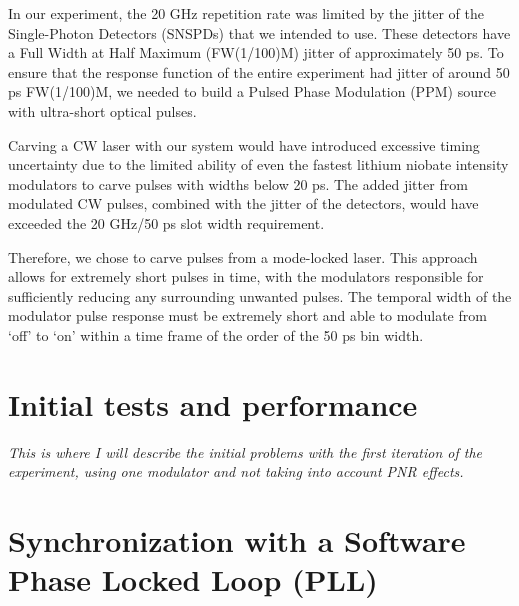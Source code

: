 \documentclass[12pt]{caltech_thesis}
\begin{document}
In our experiment, the 20 GHz repetition rate was limited by the jitter
of the Single-Photon Detectors (SNSPDs) that we intended to use. These
detectors have a Full Width at Half Maximum (FW(1/100)M) jitter of
approximately 50 ps. To ensure that the response function of the entire
experiment had jitter of around 50 ps FW(1/100)M, we needed to build a
Pulsed Phase Modulation (PPM) source with ultra-short optical pulses.

Carving a CW laser with our system would have introduced excessive
timing uncertainty due to the limited ability of even the fastest
lithium niobate intensity modulators to carve pulses with widths below
20 ps. The added jitter from modulated CW pulses, combined with the
jitter of the detectors, would have exceeded the 20 GHz/50 ps slot width
requirement.

Therefore, we chose to carve pulses from a mode-locked laser. This
approach allows for extremely short pulses in time, with the modulators
responsible for sufficiently reducing any surrounding unwanted pulses.
The temporal width of the modulator pulse response must be extremely
short and able to modulate from `off' to `on' within a time frame of the
order of the 50 ps bin width.

\hypertarget{initial-tests-and-performance}{%
\section{Initial tests and
performance}\label{initial-tests-and-performance}}

\emph{This is where I will describe the initial problems with the first
iteration of the experiment, using one modulator and not taking into
account PNR effects.}

\hypertarget{synchronization-with-a-software-phase-locked-loop-pll}{%
\section{Synchronization with a Software Phase Locked Loop
(PLL)}\label{synchronization-with-a-software-phase-locked-loop-pll}}
\end{document}
